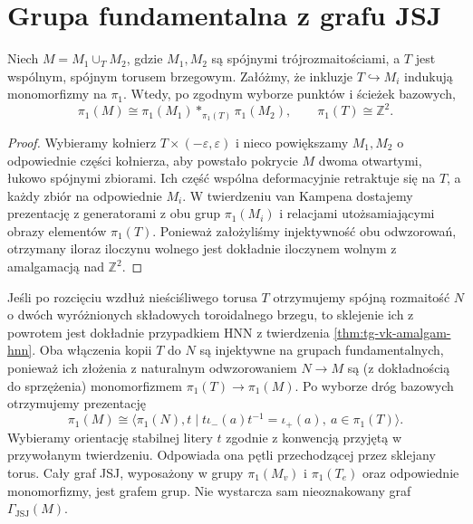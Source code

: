 \section{Grupa fundamentalna z grafu JSJ}
\label{sec:tg-jsj-groups}

\begin{stwierdzenie}
Niech $M=M_1\cup_T M_2$, gdzie $M_1,M_2$ są
spójnymi trójrozmaitościami, a $T$ jest wspólnym,
spójnym torusem brzegowym. Załóżmy, że inkluzje
$T\hookrightarrow M_i$ indukują monomorfizmy na
$\pi_1$. Wtedy, po zgodnym wyborze punktów i ścieżek
bazowych,
\[
\pi_1(M)\cong\pi_1(M_1)
 *_{\pi_1(T)}\pi_1(M_2),
\qquad \pi_1(T)\cong\mathbb Z^2.
\]
\end{stwierdzenie}
\begin{proof}
Wybieramy kołnierz $T\times(-\varepsilon,\varepsilon)$
i nieco powiększamy $M_1,M_2$ o odpowiednie części
kołnierza, aby powstało pokrycie $M$ dwoma
otwartymi, łukowo spójnymi zbiorami. Ich część
wspólna deformacyjnie retraktuje się na $T$, a
każdy zbiór na odpowiednie $M_i$. W twierdzeniu
van Kampena dostajemy prezentację z generatorami
z obu grup $\pi_1(M_i)$ i relacjami utożsamiającymi
obrazy elementów $\pi_1(T)$. Ponieważ założyliśmy
injektywność obu odwzorowań, otrzymany iloraz
iloczynu wolnego jest dokładnie iloczynem wolnym
z amalgamacją nad $\mathbb Z^2$.
\end{proof}

\begin{uwaga}
Jeśli po rozcięciu wzdłuż nieściśliwego torusa
$T$ otrzymujemy spójną rozmaitość $N$ o dwóch
wyróżnionych składowych toroidalnego brzegu,
to sklejenie ich z powrotem jest dokładnie
przypadkiem HNN z twierdzenia \ref{thm:tg-vk-amalgam-hnn}.
Oba włączenia kopii $T$ do $N$ są injektywne
na grupach fundamentalnych, ponieważ ich złożenia
z naturalnym odwzorowaniem $N\to M$ są (z dokładnością
do sprzężenia) monomorfizmem $\pi_1(T)\to\pi_1(M)$.
Po wyborze dróg bazowych otrzymujemy prezentację
\[
\pi_1(M)\cong
\langle \pi_1(N),t\mid
t\iota_-(a)t^{-1}=\iota_+(a),\ a\in\pi_1(T)\rangle.
\]
Wybieramy orientację stabilnej litery $t$ zgodnie
z konwencją przyjętą w przywołanym twierdzeniu.
Odpowiada ona pętli przechodzącej przez sklejany torus.
Cały graf JSJ, wyposażony w grupy
$\pi_1(M_v)$ i $\pi_1(T_e)$ oraz odpowiednie
monomorfizmy, jest grafem grup. Nie wystarcza
sam nieoznakowany graf $\Gamma_{\mathrm{JSJ}}(M)$.
\end{uwaga}

